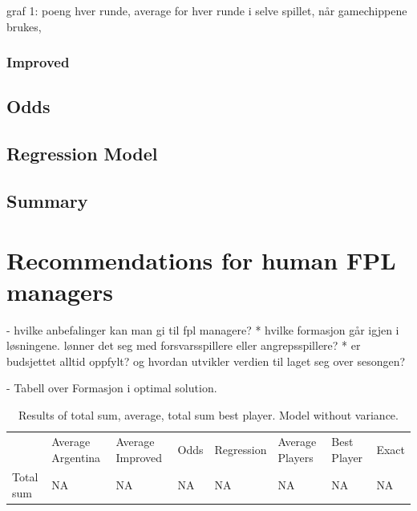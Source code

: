 graf 1: poeng hver runde, average for hver runde i selve spillet, når gamechippene brukes,


\subsubsection{Improved}


\subsection{Odds}
\subsection{Regression Model}
\subsection{Summary}

\section{Recommendations for human FPL managers}

- hvilke anbefalinger kan man gi til fpl managere? 
     * hvilke formasjon går igjen i løsningene. lønner det seg med forsvarsspillere eller angrepsspillere?  
    * er budsjettet alltid oppfylt? og hvordan utvikler verdien til laget seg over sesongen? 
    
    - Tabell over Formasjon i optimal solution. 

\begin{table}[H]
\centering
\caption{Results of total sum, average, total sum best player. Model without variance.}
\begin{tabular}{llllllll}
& Average Argentina & Average Improved & Odds & Regression  & Average Players & Best Player & Exact\\
Total sum  & NA  & NA & NA & NA & NA & NA & NA \\
\end{tabular}
\end{table}

